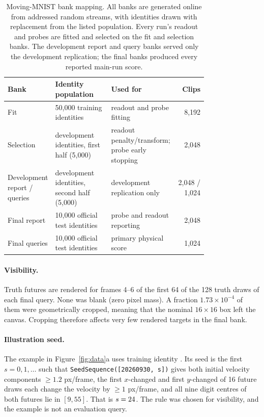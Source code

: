 \begin{table}[htbp]
\caption{Moving-MNIST bank mapping. All banks are generated online from addressed random streams, with identities drawn with replacement from the listed population. Every run's readout and probes are fitted and selected on the fit and selection banks. The development report and query banks served only the development replication; the final banks produced every reported main-run score.}
\label{tab:mmbanks}
\centering
\small
\begin{tabular}{@{}p{0.19\linewidth}p{0.29\linewidth}p{0.3\linewidth}r@{}}
\toprule
Bank & Identity population & Used for & Clips \\
\midrule
Fit & 50{,}000 training identities & readout and probe fitting & 8{,}192 \\
Selection & development identities, first half (5{,}000) & readout penalty/transform; probe early stopping & 2{,}048 \\
Development report / queries & development identities, second half (5{,}000) & development replication only & 2{,}048 / 1{,}024 \\
Final report & 10{,}000 official test identities & probe and readout reporting & 2{,}048 \\
Final queries & 10{,}000 official test identities & primary physical score & 1{,}024 \\
\bottomrule
\end{tabular}
\end{table}

\paragraph{Visibility.} Truth futures are rendered for frames 4--6 of the first 64 of the 128 truth draws of each final query. None was blank (zero pixel mass). A fraction $1.73\times10^{-4}$ of them were geometrically cropped, meaning that the nominal $16{\times}16$ box left the canvas. Cropping therefore affects very few rendered targets in the final bank.

\paragraph{Illustration seed.} The example in Figure~\ref{fig:data}a uses training identity \texttt{\VFigMMIdentity}. Its seed is the first $s=0,1,\dots$ such that \texttt{SeedSequence([20260930, s])} gives both initial velocity components $\ge1.2$ px/frame, the first $x$-changed and first $y$-changed of 16 future draws each change the velocity by $\ge1$ px/frame, and all nine digit centres of both futures lie in $[9,55]$. That is $s=24$. The rule was chosen for visibility, and the example is not an evaluation query.

